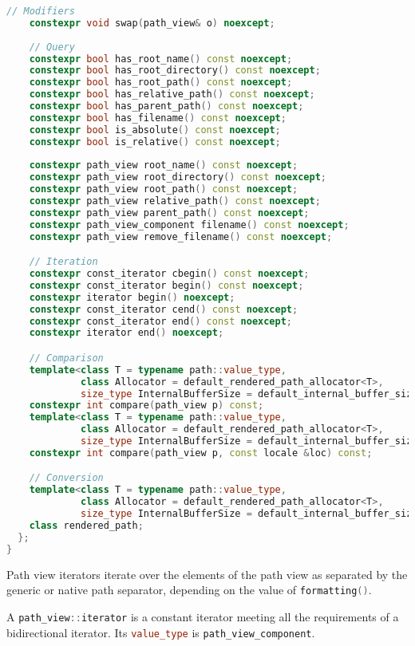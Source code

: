 \documentclass[11pt]{article}
\newcommand{\code}[2][cpp]{\lstinline[language=#1,basicstyle=\small\ttfamily]{#2}}
\begin{document}
\begin{lstlisting}[language=cpp]
    // Modifiers
    constexpr void swap(path_view& o) noexcept;
    
    // Query
    constexpr bool has_root_name() const noexcept;
    constexpr bool has_root_directory() const noexcept;
    constexpr bool has_root_path() const noexcept;
    constexpr bool has_relative_path() const noexcept;
    constexpr bool has_parent_path() const noexcept;
    constexpr bool has_filename() const noexcept;
    constexpr bool is_absolute() const noexcept;
    constexpr bool is_relative() const noexcept;
    
    constexpr path_view root_name() const noexcept;
    constexpr path_view root_directory() const noexcept;
    constexpr path_view root_path() const noexcept;
    constexpr path_view relative_path() const noexcept;
    constexpr path_view parent_path() const noexcept;
    constexpr path_view_component filename() const noexcept;
    constexpr path_view remove_filename() const noexcept;

    // Iteration
    constexpr const_iterator cbegin() const noexcept;
    constexpr const_iterator begin() const noexcept;
    constexpr iterator begin() noexcept;
    constexpr const_iterator cend() const noexcept;
    constexpr const_iterator end() const noexcept;
    constexpr iterator end() noexcept;

    // Comparison
    template<class T = typename path::value_type,
             class Allocator = default_rendered_path_allocator<T>,
             size_type InternalBufferSize = default_internal_buffer_size>
    constexpr int compare(path_view p) const;
    template<class T = typename path::value_type,
             class Allocator = default_rendered_path_allocator<T>,
             size_type InternalBufferSize = default_internal_buffer_size>
    constexpr int compare(path_view p, const locale &loc) const;

    // Conversion
    template<class T = typename path::value_type,
             class Allocator = default_rendered_path_allocator<T>,
             size_type InternalBufferSize = default_internal_buffer_size>
    class rendered_path;
  };
}
\end{lstlisting}

Path view iterators iterate over the elements of the path view as separated by the generic or native path separator, depending on the value of \code{formatting()}.

A \code{path_view::iterator} is a constant iterator meeting all the requirements of a bidirectional iterator. Its \code{value_type} is \code{path_view_component}.
\end{document}
